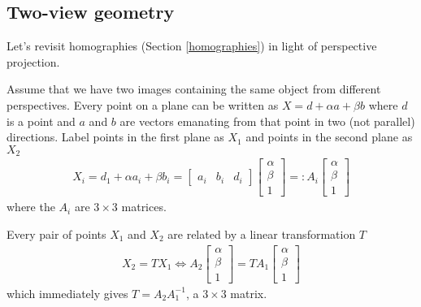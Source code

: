 \documentclass[11pt]{article}
\begin{document}
\subsection{Two-view geometry}
Let's revisit homographies (Section \ref{homographies}) in light of perspective projection. 

Assume that we have two images containing the same object from different perspectives. Every point on a plane can be written as $X = d + \alpha a + \beta b$ where $d$ is a point and $a$ and $b$ are vectors emanating from that point in two (not parallel) directions. Label points in the first plane as $X_1$ and points in the second plane as $X_2$
\begin{align*}
    X_i = d_1 + \alpha a_i + \beta b_i = \begin{bmatrix}
        a_i & b_i  & d_i 
    \end{bmatrix}
    \begin{bmatrix}
        \alpha \\ \beta \\ 1
    \end{bmatrix}
    =: A_i 
    \begin{bmatrix}
        \alpha \\ \beta \\ 1
    \end{bmatrix}
\end{align*}
where the $A_i$ are $3\times 3$ matrices. 

Every pair of points $X_1$ and $X_2$ are related by a linear transformation $T$
\begin{align*}
    X_2 = TX_1 \iff A_2 
    \begin{bmatrix}
        \alpha \\ \beta \\ 1
    \end{bmatrix}
    = T A_1 
    \begin{bmatrix}
        \alpha \\ \beta \\ 1
    \end{bmatrix}
\end{align*}
which immediately gives $T = A_2 A_1^{-1}$, a $3 \times 3$ matrix. 
\end{document}
